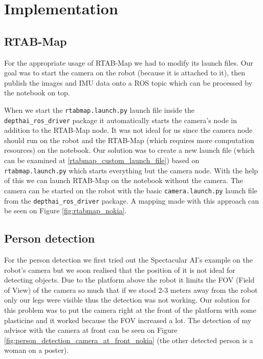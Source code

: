 \chapter{Implementation} \label{implementation}

\section{RTAB-Map}

For the appropriate usage of RTAB-Map we had to modify its launch files. Our goal was to start the camera on the robot (because it is attached to it), then publish the images and IMU data onto a ROS topic which can be processed by the notebook on top.

When we start the \verb|rtabmap.launch.py| launch file inside the \verb|depthai_ros_driver| package it automatically starts the camera's node in addition to the RTAB-Map node. It was not ideal for us since the camera node should run on the robot and the RTAB-Map (which requires more computation resources) on the notebook. Our solution was to create a new launch file (which can be examined at \ref{rtabmap_custom_launch_file}) based on \verb|rtabmap.launch.py| which starts everything but the camera node. With the help of this we can launch RTAB-Map on the notebook without the camera. The camera can be started on the robot with the basic \verb|camera.launch.py| launch file from the \verb|depthai_ros_driver| package. A mapping made with this approach can be seen on Figure \ref{fig:rtabmap_nokia}.

\section{Person detection}

For the person detection we first tried out the Spectacular AI's example on the robot's camera but we soon realised that the position of it is not ideal for detecting objects. Due to the platform above the robot it limits the FOV (Field of View) of the camera so much that if we stood 2-3 meters away from the robot only our legs were visible thus the detection was not working. Our solution for this problem was to put the camera right at the front of the platform with some plasticine and it worked because the FOV increased a lot. The detection of my advisor with the camera at front can be seen on Figure \ref{fig:person_detection_camera_at_front_nokia} (the other detected person is a woman on a poster).

